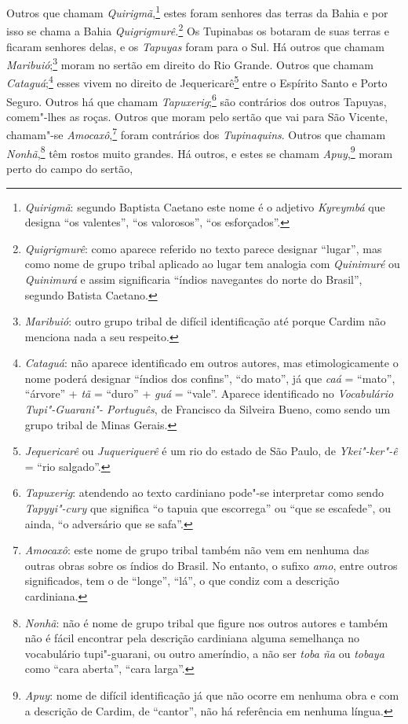  Outros que chamam \textit{Quirigmã},\footnote{ \textit{Quirigmã}:  
segundo Baptista Caetano este nome é o adjetivo \textit{Kyreymbá} que
designa ``os valentes'', ``os valorosos'', ``os esforçados''.} estes
foram senhores das terras da Bahia e por isso se chama a Bahia
\textit{Quigrigmurê.}\footnote{ \textit{Quigrigmurê}: como aparece
referido no texto parece designar ``lugar'', mas como nome de grupo
tribal aplicado ao lugar tem analogia com \textit{Quinimuré} ou
\textit{Quinimurá} e assim significaria ``índios navegantes do norte do
Brasil'', segundo Batista Caetano.} Os Tupinabas os botaram de
suas terras e ficaram senhores delas, e os \textit{Tapuyas} foram para
o Sul. Há outros que chamam \textit{Maribuió};\footnote{ \textit{Maribuió}: 
outro grupo tribal de difícil identificação até
porque Cardim não menciona nada a seu respeito.} moram no
sertão em direito do Rio Grande. Outros que chamam 
\textit{Cataguá};\footnote{ \textit{Cataguá}: não aparece identificado em outros
autores, mas etimologicamente o nome poderá designar ``índios dos
confins'', ``do mato'', já que \textit{caá} = ``mato'', ``árvore'' +
\textit{tã} = ``duro'' + \textit{guá} = ``vale''. Aparece identificado no
\textit{Vocabulário Tupi"-Guarani"- Português}, de Francisco da Silveira
Bueno, como sendo um grupo tribal de Minas Gerais.} esses
vivem no direito de Jequericarê\footnote{ \textit{Jequericarê} ou
\textit{Juqueriquerê} é um rio do estado de São Paulo, de
\textit{Ykei"-ker"-ê} = ``rio salgado''.} entre o Espírito Santo e Porto
Seguro. Outros há que chamam 
\textit{Tapuxerig};\footnote{ \textit{Tapuxerig}: atendendo ao texto 
cardiniano pode"-se interpretar
como sendo \textit{Tapyyi"-cury} que significa ``o tapuia que escorrega''
ou ``que se escafede'', ou ainda, ``o adversário que se safa''.} 
são contrários dos outros Tapuyas, comem"-lhes as roças. Outros que
moram pelo sertão que vai para São Vicente, chamam"-se
\textit{Amocaxô},\footnote{ \textit{Amocaxô}: este nome de grupo
tribal também não vem em nenhuma das outras obras sobre os índios do
Brasil. No entanto, o sufixo \textit{amo}, entre outros significados,
tem o de ``longe'', ``lá'', o que condiz com a descrição
cardiniana.} foram contrários dos \textit{Tupinaquins}. Outros
que chamam \textit{Nonhã},\footnote{ \textit{Nonhã}: não é nome de
grupo tribal que figure nos outros autores e também não é fácil
encontrar pela descrição cardiniana alguma semelhança no vocabulário
tupi"-guarani, ou outro ameríndio, a não ser \textit{toba ña} ou
\textit{tobaya} como ``cara aberta'', ``cara larga''.} têm rostos
muito grandes. Há outros, e estes se chamam \textit{Apuy},\footnote{ \textit{Apuy}: 
nome de difícil identificação já que não ocorre em
nenhuma obra e com a descrição de Cardim, de ``cantor'', não há
referência em nenhuma língua.} moram perto do campo do sertão,
